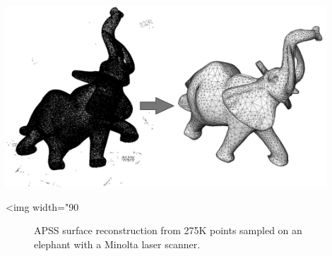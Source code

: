 \begin{center}
    \label{Surface_reconstruction_points_3-fig-introduction}
    \begin{ccTexOnly}
        \includegraphics[width=0.9\textwidth]{Surface_reconstruction_points_3/introduction} %
    \end{ccTexOnly}
    \begin{ccHtmlOnly}
        <img width="90%
    \end{ccHtmlOnly}
    \begin{figure}[h]
        \caption{APSS surface reconstruction from 275K
                 points sampled on an elephant
                 with a Minolta laser scanner.}
    \end{figure}
\end{center}


